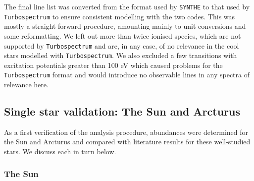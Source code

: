 \documentclass{aa}
\begin{document}
The final line list was converted from the format used by \texttt{SYNTHE} to that used by \texttt{Turbospectrum} to ensure consistent modelling with the two codes. This was mostly a straight forward procedure, amounting mainly to unit conversions and some reformatting. We left out more than twice ionised species, which are not supported by \texttt{Turbospectrum} and are, in any case, of no relevance in the cool stars modelled with \texttt{Turbospectrum}. We also excluded a few transitions with excitation potentials greater than 100 eV which caused problems for the \texttt{Turbospectrum} format and would introduce no observable lines in any spectra of relevance here.  

\subsection{Single star validation: The Sun and Arcturus}

As a first verification of the analysis procedure, abundances were determined for the Sun and Arcturus and compared with literature results for these well-studied stars. We discuss each in turn below.

\subsubsection{The Sun}
\label{sec:sun}
\end{document}
